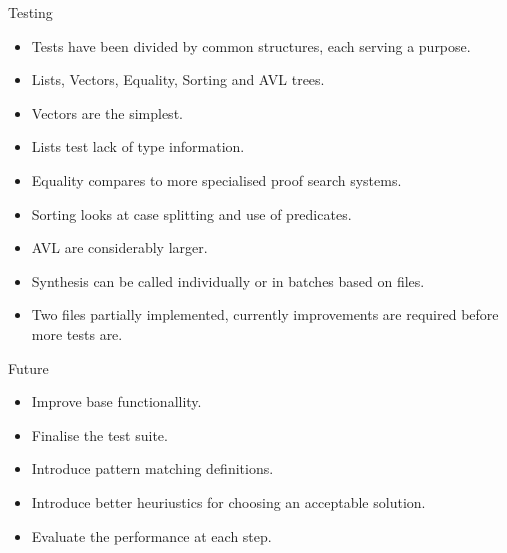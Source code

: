 \documentclass[presentation]{beamer}
\begin{document}
\begin{frame}[fragile]{Testing}
  \begin{itemize}
  \item Tests have been divided by common structures,
    each serving a purpose.\\
  \item Lists, Vectors, Equality, Sorting and AVL trees.\\
  \item Vectors are the simplest.\\
  \item Lists test lack of type information.\\
  \item Equality compares to more specialised proof search systems.\\
  \item Sorting looks at case splitting and use of predicates.\\
  \item AVL are considerably larger.\\
  \item Synthesis can be called individually or in batches based
    on files.\\
  \item Two files partially implemented, currently improvements
    are required before more tests are.
  \end{itemize}
\end{frame}

\begin{frame}[fragile]{Future}
  \begin{itemize}
  \item Improve base functionallity.\\
  \item Finalise the test suite.\\
  \item Introduce pattern matching definitions.\\
  \item Introduce better heuriustics for choosing an acceptable solution.\\
  \item Evaluate the performance at each step.
  \end{itemize}
\end{frame}
\end{document}
